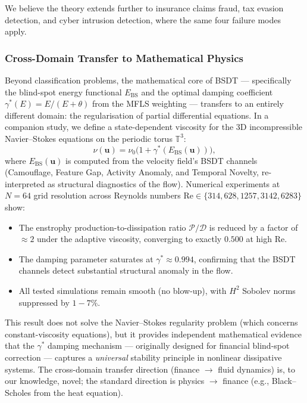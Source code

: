 \documentclass[journal]{IEEEtran}
\begin{document}
We believe the theory extends further to insurance claims fraud, tax evasion detection, and cyber intrusion detection, where the same four failure modes apply.

\subsubsection{Cross-Domain Transfer to Mathematical Physics}

Beyond classification problems, the mathematical core of BSDT --- specifically the blind-spot energy functional $E_{\mathrm{BS}}$ and the optimal damping coefficient $\gamma^*(E) = E/(E+\theta)$ from the MFLS weighting --- transfers to an entirely different domain: the regularisation of partial differential equations. In a companion study, we define a state-dependent viscosity for the 3D incompressible Navier--Stokes equations on the periodic torus $\mathbb{T}^3$:
\begin{equation}
  \nu(\mathbf{u}) = \nu_0\bigl(1 + \gamma^*(E_{\mathrm{BS}}(\mathbf{u}))\bigr),
\end{equation}
where $E_{\mathrm{BS}}(\mathbf{u})$ is computed from the velocity field's BSDT channels (Camouflage, Feature Gap, Activity Anomaly, and Temporal Novelty, re-interpreted as structural diagnostics of the flow). Numerical experiments at $N = 64$ grid resolution across Reynolds numbers $\mathrm{Re} \in \{314, 628, 1257, 3142, 6283\}$ show:
\begin{itemize}
  \item The enstrophy production-to-dissipation ratio $\mathcal{P}/\mathcal{D}$ is reduced by a factor of $\approx 2$ under the adaptive viscosity, converging to exactly $0.500$ at high Re.
  \item The damping parameter saturates at $\gamma^* \approx 0.994$, confirming that the BSDT channels detect substantial structural anomaly in the flow.
  \item All tested simulations remain smooth (no blow-up), with $H^2$ Sobolev norms suppressed by $1{-}7\%$.
\end{itemize}
This result does not solve the Navier--Stokes regularity problem (which concerns constant-viscosity equations), but it provides independent mathematical evidence that the $\gamma^*$ damping mechanism --- originally designed for financial blind-spot correction --- captures a \textit{universal} stability principle in nonlinear dissipative systems. The cross-domain transfer direction (finance $\to$ fluid dynamics) is, to our knowledge, novel; the standard direction is physics $\to$ finance (e.g., Black--Scholes from the heat equation).
\end{document}
